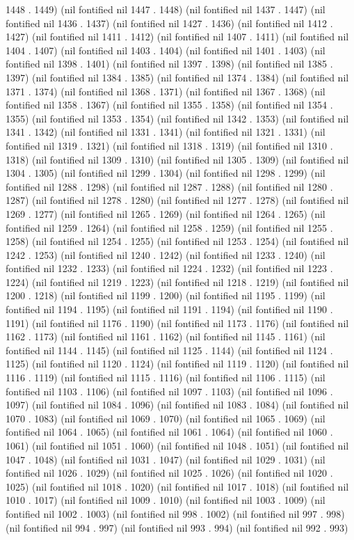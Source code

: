 1448 . 1449) (nil fontified nil 1447 . 1448) (nil fontified nil 1437 . 1447) (nil fontified nil 1436 . 1437) (nil fontified nil 1427 . 1436) (nil fontified nil 1412 . 1427) (nil fontified nil 1411 . 1412) (nil fontified nil 1407 . 1411) (nil fontified nil 1404 . 1407) (nil fontified nil 1403 . 1404) (nil fontified nil 1401 . 1403) (nil fontified nil 1398 . 1401) (nil fontified nil 1397 . 1398) (nil fontified nil 1385 . 1397) (nil fontified nil 1384 . 1385) (nil fontified nil 1374 . 1384) (nil fontified nil 1371 . 1374) (nil fontified nil 1368 . 1371) (nil fontified nil 1367 . 1368) (nil fontified nil 1358 . 1367) (nil fontified nil 1355 . 1358) (nil fontified nil 1354 . 1355) (nil fontified nil 1353 . 1354) (nil fontified nil 1342 . 1353) (nil fontified nil 1341 . 1342) (nil fontified nil 1331 . 1341) (nil fontified nil 1321 . 1331) (nil fontified nil 1319 . 1321) (nil fontified nil 1318 . 1319) (nil fontified nil 1310 . 1318) (nil fontified nil 1309 . 1310) (nil fontified nil 1305 . 1309) (nil fontified nil 1304 . 1305) (nil fontified nil 1299 . 1304) (nil fontified nil 1298 . 1299) (nil fontified nil 1288 . 1298) (nil fontified nil 1287 . 1288) (nil fontified nil 1280 . 1287) (nil fontified nil 1278 . 1280) (nil fontified nil 1277 . 1278) (nil fontified nil 1269 . 1277) (nil fontified nil 1265 . 1269) (nil fontified nil 1264 . 1265) (nil fontified nil 1259 . 1264) (nil fontified nil 1258 . 1259) (nil fontified nil 1255 . 1258) (nil fontified nil 1254 . 1255) (nil fontified nil 1253 . 1254) (nil fontified nil 1242 . 1253) (nil fontified nil 1240 . 1242) (nil fontified nil 1233 . 1240) (nil fontified nil 1232 . 1233) (nil fontified nil 1224 . 1232) (nil fontified nil 1223 . 1224) (nil fontified nil 1219 . 1223) (nil fontified nil 1218 . 1219) (nil fontified nil 1200 . 1218) (nil fontified nil 1199 . 1200) (nil fontified nil 1195 . 1199) (nil fontified nil 1194 . 1195) (nil fontified nil 1191 . 1194) (nil fontified nil 1190 . 1191) (nil fontified nil 1176 . 1190) (nil fontified nil 1173 . 1176) (nil fontified nil 1162 . 1173) (nil fontified nil 1161 . 1162) (nil fontified nil 1145 . 1161) (nil fontified nil 1144 . 1145) (nil fontified nil 1125 . 1144) (nil fontified nil 1124 . 1125) (nil fontified nil 1120 . 1124) (nil fontified nil 1119 . 1120) (nil fontified nil 1116 . 1119) (nil fontified nil 1115 . 1116) (nil fontified nil 1106 . 1115) (nil fontified nil 1103 . 1106) (nil fontified nil 1097 . 1103) (nil fontified nil 1096 . 1097) (nil fontified nil 1084 . 1096) (nil fontified nil 1083 . 1084) (nil fontified nil 1070 . 1083) (nil fontified nil 1069 . 1070) (nil fontified nil 1065 . 1069) (nil fontified nil 1064 . 1065) (nil fontified nil 1061 . 1064) (nil fontified nil 1060 . 1061) (nil fontified nil 1051 . 1060) (nil fontified nil 1048 . 1051) (nil fontified nil 1047 . 1048) (nil fontified nil 1031 . 1047) (nil fontified nil 1029 . 1031) (nil fontified nil 1026 . 1029) (nil fontified nil 1025 . 1026) (nil fontified nil 1020 . 1025) (nil fontified nil 1018 . 1020) (nil fontified nil 1017 . 1018) (nil fontified nil 1010 . 1017) (nil fontified nil 1009 . 1010) (nil fontified nil 1003 . 1009) (nil fontified nil 1002 . 1003) (nil fontified nil 998 . 1002) (nil fontified nil 997 . 998) (nil fontified nil 994 . 997) (nil fontified nil 993 . 994) (nil fontified nil 992 . 993) 